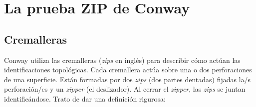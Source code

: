 \documentclass[10pt]{report}
\theoremstyle{definition}
\begin{document}

\chapter{La prueba ZIP de Conway}

\section{Cremalleras}


Conway utiliza las cremalleras (\textit{zips} en inglés) para describir cómo actúan las identificaciones topológicas. Cada cremallera actúa sobre una o dos perforaciones de una superficie. Están formadas por dos \textit{zips} (dos partes dentadas) fijadas la/s perforación/es y un \textit{zipper} (el deslizador). Al cerrar el \textit{zipper}, las \textit{zips} se juntan identificándose. Trato de dar una definición rigurosa:
\end{document}
